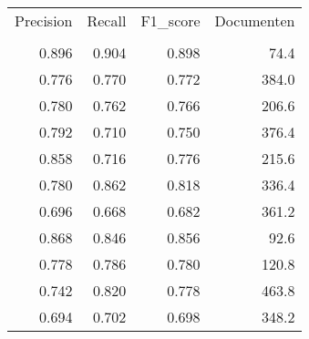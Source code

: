 \begin{tabular}{rrrr}
\toprule
 Precision &  Recall &  F1\_score &  Documenten \\
           &         &           &             \\
\midrule
     0.896 &   0.904 &     0.898 &        74.4 \\
     0.776 &   0.770 &     0.772 &       384.0 \\
     0.780 &   0.762 &     0.766 &       206.6 \\
     0.792 &   0.710 &     0.750 &       376.4 \\
     0.858 &   0.716 &     0.776 &       215.6 \\
     0.780 &   0.862 &     0.818 &       336.4 \\
     0.696 &   0.668 &     0.682 &       361.2 \\
     0.868 &   0.846 &     0.856 &        92.6 \\
     0.778 &   0.786 &     0.780 &       120.8 \\
     0.742 &   0.820 &     0.778 &       463.8 \\
     0.694 &   0.702 &     0.698 &       348.2 \\
\bottomrule
\end{tabular}
